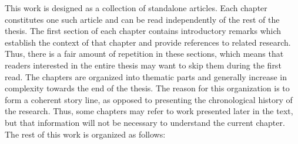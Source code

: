 This work is designed as a collection of standalone articles. Each chapter
constitutes one such article and can be read independently of the rest of the
thesis. The first section of each chapter contains introductory remarks which
establish the context of that chapter and provide references to related
research. Thus, there is a fair amount of repetition in these sections, which
means that readers interested in the entire thesis may want to skip them during
the first read. The chapters are organized into thematic parts and generally
increase in complexity towards the end of the thesis. The reason for this
organization is to form a coherent story line, as opposed to presenting the
chronological history of the research. Thus, some chapters may refer to work
presented later in the text, but that information will not be necessary to
understand the current chapter. The rest of this work is organized as follows:
